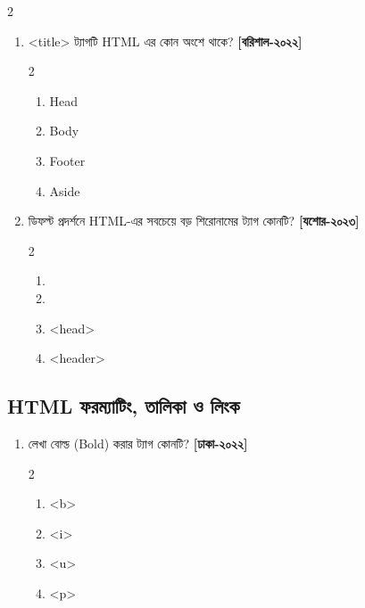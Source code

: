 \begin{multicols}{2}
\begin{enumerate}[series=chFourFinalQuestions]
\begin{minipage}[t]{\linewidth}
\end{minipage}

\item \begin{minipage}[t]{\linewidth}
<title> ট্যাগটি HTML এর কোন অংশে থাকে? \textbf{[বরিশাল-২০২২]}
\begin{multicols}{2}
\begin{enumerate}[label=\alph*)]
\item Head 
\item Body
\item Footer
\item Aside
\end{enumerate}
\end{multicols}
\par\addvspace{2pt}


\end{minipage}

\item \begin{minipage}[t]{\linewidth}
ডিফল্ট প্রদর্শনে HTML-এর সবচেয়ে বড় শিরোনামের ট্যাগ কোনটি? \textbf{[যশোর-২০২৩]}
\begin{multicols}{2}
\begin{enumerate}[label=\alph*)]
\item <h1> 
\item <h6>
\item <head>
\item <header>
\end{enumerate}
\end{multicols}
\par\addvspace{2pt}


\end{minipage}

\end{enumerate}

\subsection*{HTML ফরম্যাটিং, তালিকা ও লিংক}

\begin{enumerate}[resume=chFourFinalQuestions]

\item \begin{minipage}[t]{\linewidth}
লেখা বোল্ড (Bold) করার ট্যাগ কোনটি? \textbf{[ঢাকা-২০২২]}
\begin{multicols}{2}
\begin{enumerate}[label=\alph*)]
\item <b> 
\item <i>
\item <u>
\item <p>
\end{enumerate}
\end{multicols}
\par\addvspace{2pt}



\end{minipage}
\end{enumerate}
\end{multicols}
